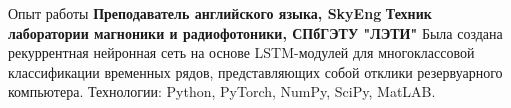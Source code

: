 \begin{rubric}{Опыт работы}
 \textbf{Преподаватель английского языка, SkyEng}
 \textbf{Техник лаборатории магноники и радиофотоники, СПбГЭТУ "ЛЭТИ"}
\newline
\newline \qquad
    Была создана рекуррентная нейронная сеть на основе LSTM-модулей для многоклассовой классификации временных рядов, представляющих собой отклики резервуарного компьютера.
\newline
    Технологии: Python, PyTorch, NumPy, SciPy, MatLAB.
\end{rubric}